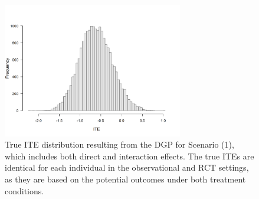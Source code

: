 % 




\begin{figure}[htbp]
\centering
\includegraphics[width=0.7\textwidth]{img/results/observ_scenario1_ite_distribution_dgp.png}
\caption{True ITE distribution resulting from the DGP for Scenario (1), which includes both direct and interaction effects. The true ITEs are identical for each individual in the observational and RCT settings, as they are based on the potential outcomes under both treatment conditions.}
\label{fig:scenario1_ite_distribution_dgp}
\end{figure}



